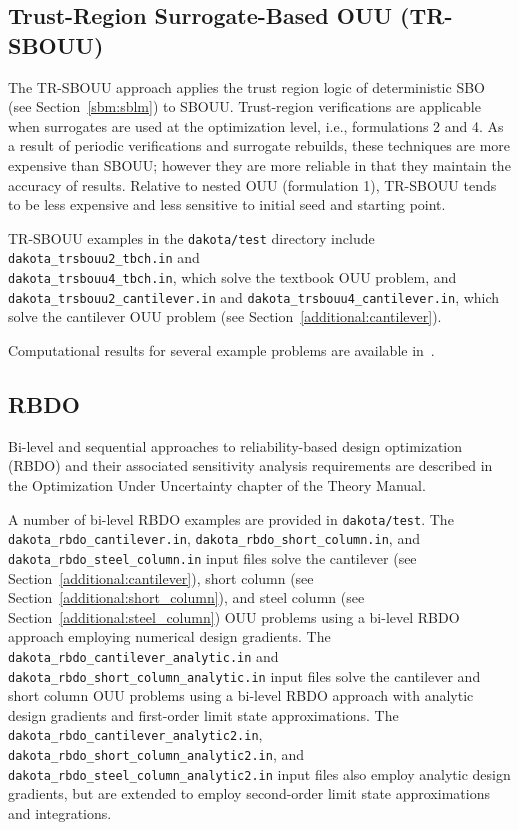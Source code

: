 \subsection{Trust-Region Surrogate-Based OUU (TR-SBOUU)}\label{adv_models:ouu:trsb}

The TR-SBOUU approach applies the trust region logic of deterministic
SBO (see Section~\ref{sbm:sblm}) to SBOUU. Trust-region verifications
are applicable when surrogates are used at the optimization level,
i.e., formulations 2 and 4. As a result of periodic verifications and
surrogate rebuilds, these techniques are more expensive than SBOUU;
however they are more reliable in that they maintain the accuracy of
results. Relative to nested OUU (formulation 1), TR-SBOUU tends to be
less expensive and less sensitive to initial seed and starting point.

TR-SBOUU examples in the \texttt{dakota/test} directory include
\texttt{dakota\_trsbouu2\_tbch.in} and\\
\texttt{dakota\_trsbouu4\_tbch.in}, which solve the textbook OUU
problem, and\\ \texttt{dakota\_trsbouu2\_cantilever.in} and
\texttt{dakota\_trsbouu4\_cantilever.in}, which solve the cantilever
OUU problem (see Section~\ref{additional:cantilever}).

Computational results for several example problems are available
in~\cite{Eld02}.

\subsection{RBDO} \label{adv_models:ouu:rbdo}

Bi-level and sequential approaches to reliability-based design
optimization (RBDO) and their associated sensitivity analysis
requirements are described in the Optimization Under Uncertainty
chapter of the Theory Manual.

A number of bi-level RBDO examples are provided in \texttt{dakota/test}.
The \texttt{dakota\_rbdo\_cantilever.in},
\texttt{dakota\_rbdo\_short\_column.in}, and
\texttt{dakota\_rbdo\_steel\_column.in} input files solve the
cantilever (see Section~\ref{additional:cantilever}), short column
(see Section~\ref{additional:short_column}), and steel column (see
Section~\ref{additional:steel_column}) OUU problems using a bi-level
RBDO approach employing numerical design gradients.  The 
\texttt{dakota\_rbdo\_cantilever\_analytic.in} and
\texttt{dakota\_rbdo\_short\_column\_analytic.in} input files solve
the cantilever and short column OUU problems using a bi-level RBDO
approach with analytic design gradients and first-order limit state
approximations.  The \texttt{dakota\_rbdo\_cantilever\_analytic2.in},
\texttt{dakota\_rbdo\_short\_column\_analytic2.in}, and
\texttt{dakota\_rbdo\_steel\_column\_analytic2.in} input files also
employ analytic design gradients, but are extended to employ
second-order limit state approximations and integrations.

